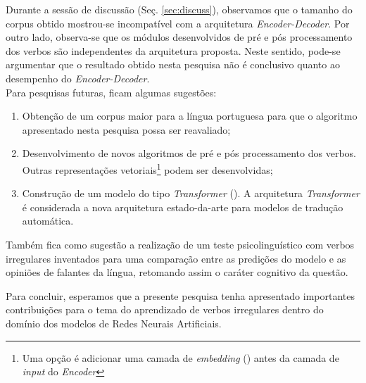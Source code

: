 Durante a sessão de discussão (Seç. \ref{sec:discuss}), observamos que o tamanho do corpus obtido mostrou-se incompatível com a arquitetura \textit{Encoder-Decoder}. Por outro lado, observa-se que os módulos desenvolvidos de pré e pós processamento dos verbos são independentes da arquitetura proposta. Neste sentido, pode-se argumentar que o resultado obtido nesta pesquisa não é conclusivo quanto ao desempenho do \textit{Encoder-Decoder}. \\

Para pesquisas futuras, ficam algumas sugestões:

\begin{enumerate}

\item Obtenção de um corpus maior para a língua portuguesa
para que o algoritmo apresentado nesta pesquisa possa ser reavaliado;

\item Desenvolvimento de novos algoritmos de pré e pós processamento dos verbos. Outras representações vetoriais\footnote{Uma opção é adicionar uma camada de \textit{embedding} (\cite{Jurafsky:2009:SLP:1214993}) antes da camada de \textit{input} do \textit{Encoder}} podem ser desenvolvidas; 

\item Construção de um modelo do tipo \textit{Transformer} (\cite{Vaswani2017AttentionIA}). A arquitetura \textit{Transformer} é considerada a nova arquitetura estado-da-arte para modelos de tradução automática. 

\end{enumerate}

Também fica como sugestão a realização de um teste psicolinguístico com verbos irregulares inventados para uma comparação entre as predições do modelo e as opiniões de falantes da língua, retomando assim o caráter cognitivo da questão. 

Para concluir, esperamos que a presente pesquisa tenha apresentado importantes contribuições para o tema do aprendizado de verbos irregulares dentro do domínio dos modelos de Redes Neurais Artificiais. 